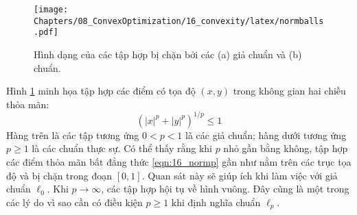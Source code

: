  

 
\begin{figure}[t]
\centering
    \texttt{[image: Chapters/08\_ConvexOptimization/16\_convexity/latex/normballs.pdf]}
    \caption[]{Hình dạng của các tập hợp bị chặn bởi  các (a) giả chuẩn và
    (b) chuẩn.} \label{fig:16_normballs}
\end{figure}

Hình \ref{fig:16_normballs} minh họa tập hợp các điểm có tọa độ $(x, y)$ trong không gian hai chiều thỏa mãn: 
\begin{equation} 
\label{eqn:16_normp}
(|x|^p + |y|^p)^{1/p} \leq 1 
\end{equation} 
Hàng trên là các tập tương ứng $0 < p < 1$ là các giả chuẩn; hàng dưới tương
ứng $p \geq 1$ là các chuẩn thực sự. Có thể thấy rằng khi $p$ nhỏ
gần bằng không, tập hợp các điểm thỏa mãn bất đẳng thức \eqref{eqn:16_normp} gần như
nằm trên các trục tọa độ và bị chặn trong đoạn $[0, 1]$. Quan sát này sẽ giúp
ích khi làm việc với giả chuẩn $\ell_0$. Khi $p \rightarrow
\infty$, các tập hợp hội tụ về hình vuông.
Đây cũng là một trong các lý do vì sao cần có điều kiện $p \geq 1$ khi định
nghĩa chuẩn $\ell_p$. 
 


 
